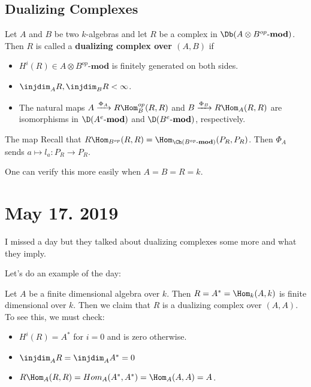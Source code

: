 \documentclass[12pt]{article}
\begin{document}
\subsection{Dualizing Complexes}
\begin{defn}
	Let $A$ and $B$ be two $k$-algebras and let $R$ be a complex in $\Db(A\otimes B^{op}\text{-}\mathbf{mod})$.
	Then $R$ is called a \textbf{dualizing complex over $(A,B)$} if 
	\begin{itemize}
		\item $H^i(R)\in A\otimes B^{op}\text{-}\mathbf{mod}$ is finitely generated on both sides.
		\item $\injdim_AR,\injdim_BR<\infty$.
		\item The natural maps $A\xrightarrow{\Phi_A}R\Hom_B^{op}(R,R)$ and $B\xrightarrow{\Phi_B} R\Hom_A(R,R)$
		are isomorphisms in $\D(A^e\text{-}\mathbf{mod})$ and $\D(B^e\text{-}\mathbf{mod})$, respectively.
	\end{itemize}
\end{defn}
\begin{rmk}
	The map Recall that $R\Hom_{B^{op}}(R,R)=\Hom_{\Ch(B^{op}\text{-}\mathbf{mod})}(P_R,P_R)$. Then $\Phi_A$ sends 
	$a\mapsto l_a:P_R\to P_R$.

	One can verify this more easily when $A=B=R=k$.
\end{rmk}

\section{May 17. 2019}
I missed a day but they talked about dualizing complexes some more and what they imply.

Let's do an example of the day:
\begin{ex}
	Let $A$ be a finite dimensional algebra over $k$. Then $R=A^\ast=\Hom_k(A,k)$ is finite dimensional over $k$. Then we claim that $R$
	is a dualizing complex over $(A,A)$. To see this, we must check:
	\begin{itemize}
		\item $H^i(R)=A^\ast$ for $i=0$ and is zero otherwise.
		\item $\injdim_AR=\injdim_AA^\ast=0$
		\item $R\Hom_A(R,R)=Hom_A(A^\ast,A^\ast)=\Hom_A(A,A)=A$.
	\end{itemize}
\end{ex}
\end{document}
